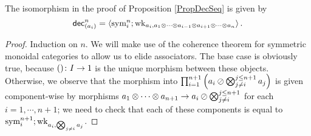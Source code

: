 \documentclass[11pt]{report}
\begin{document}
\begin{proposition}
  The isomorphism in the proof of Proposition \ref{PropDecSeq} is given by
  \[
    \operatorname{{\mathsf{dec}}}_{(a_i)}^n = \langle \operatorname{sym}_i^{n};\operatorname{wk}_{a_i,a_1\otimes\cdots\otimes a_{i-1}\otimes a_{i+1}\otimes \cdots\otimes a_n}\rangle\,.
    \]
  \label{PropDecSeqFormula}
\end{proposition}
\begin{proof}
  Induction on $n$.
  We will make use of the coherence theorem for symmetric monoidal categories \cite[]{WorkingMathematician} to allow us to elide associators.  
  The base case is obviously true, because $()\colon I \to 1$ is the unique morphism between these objects.  
  Otherwise, we observe that the morphism into $\prod_{i=1}^{n+1} \left(a_i \oslash \bigotimes_{j\ne i}^{j\le n+1} a_j\right)$ is given component-wise by morphisms $a_1 \otimes \cdots \otimes a_{n+1} \to a_i \oslash \bigotimes_{j\ne i}^{j\le n+1}$ for each $i=1,\cdots,n+1$; we need to check that each of these components is equal to $\operatorname{sym}_i^{n+1};\operatorname{wk}_{a_i,\bigotimes_{j\ne i}a_j}$.


\end{proof}
\end{document}
